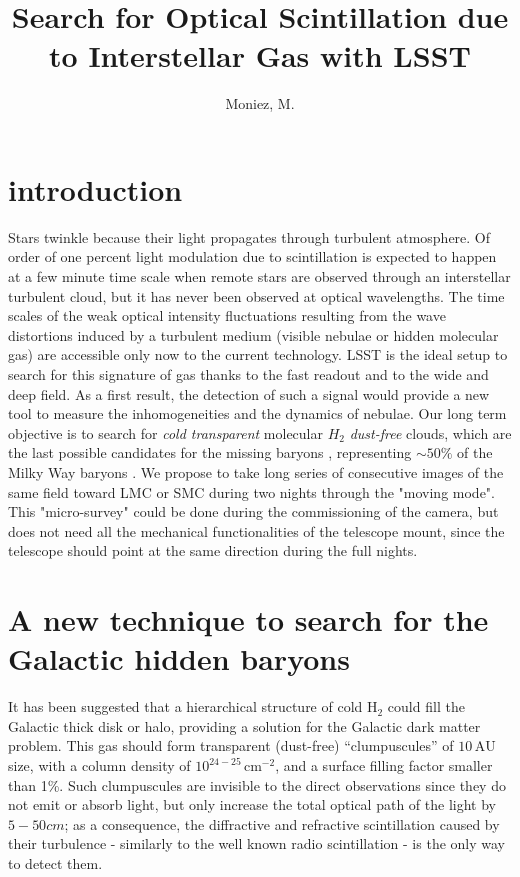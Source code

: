 \documentclass[11pt]{article}
\begin{document}
\vspace*{4cm}
\title{Search for Optical Scintillation due to Interstellar Gas with LSST}

\author{Moniez, M.}

\address{Laboratoire de l'Acc\'{e}l\'{e}rateur Lin\'{e}aire,
{\sc IN2P3-CNRS}, Universit\'e de Paris-Sud, \\
B.P. 34, 91898 Orsay Cedex, France.
E-mail: moniez@lal.in2p3.fr}

\maketitle\abstracts{
}

\section{introduction}
Stars twinkle because their light propagates through turbulent atmosphere.
Of order of one percent light modulation due to scintillation
is expected to happen at a few minute time scale when remote stars are observed
through an interstellar turbulent cloud, but it has never been
observed at optical wavelengths.
The time scales of the weak optical intensity fluctuations resulting from the
wave distortions induced by a turbulent medium (visible nebulae or
hidden molecular gas) are accessible only now to the current technology.
LSST is the ideal setup to search for this signature of gas
thanks to the fast readout and to the wide and deep field.
As a first result, the detection of such a signal would provide a new tool to
measure the inhomogeneities and the dynamics of nebulae.
Our long term objective is to search for
{\it cold transparent} molecular $H_2$ {\it dust-free} clouds, which are the last possible
candidates for the missing baryons
\cite{fractal}, \cite{pfre} representing $\sim 50\%$
of the Milky Way baryons \cite{mcetal}.
We propose to take long series of consecutive images of the same field
toward LMC or SMC during two nights through the "moving mode". This
"micro-survey" could be done during the commissioning of the camera,
but does not need all the mechanical functionalities of the telescope mount,
since the telescope should point at the same direction during the full nights.

\section{A new technique to search for the Galactic hidden baryons}
It has been suggested that a hierarchical structure of cold $\mathrm{H_2}$
could fill the Galactic thick disk\cite{fractal} or halo\cite{Jetzer1}, 
providing a solution for the Galactic dark matter problem.
This gas should form transparent (dust-free)
``clumpuscules'' of $10\,\mathrm{AU}$ size,
with a column density of $10^{24-25}\,\mathrm{cm^{-2}}$, and a
surface filling factor smaller than 1\%.
Such clumpuscules are invisible to the direct observations
since they do not emit or absorb light, but only increase the total optical path of the light by $5-50cm$;
as a consequence, the diffractive and refractive scintillation caused by their turbulence
- similarly to the well known radio scintillation - is the only way to detect them.
\end{document}
